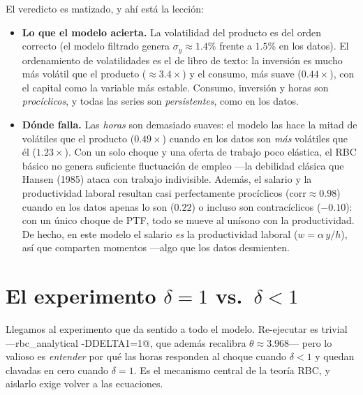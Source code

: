 \documentclass[11pt,a4paper]{report}
\begin{document}
El veredicto es matizado, y ahí está la lección:
\begin{itemize}[leftmargin=1.4em]
\item \textbf{Lo que el modelo acierta.} La volatilidad del producto es del orden
  correcto (el modelo filtrado genera $\sigma_y\approx1.4\%$ frente a $1.5\%$ en
  los datos). El ordenamiento de volatilidades es el de libro de texto: la
  inversión es mucho más volátil que el producto ($\approx3.4\times$) y el
  consumo, más suave ($0.44\times$), con el capital como la variable más estable.
  Consumo, inversión y horas son \emph{procíclicos}, y todas las series son
  \emph{persistentes}, como en los datos.
\item \textbf{Dónde falla.} Las \emph{horas} son demasiado suaves: el modelo las
  hace la mitad de volátiles que el producto ($0.49\times$) cuando en los datos
  son \emph{más} volátiles que él ($1.23\times$). Con un solo choque y una oferta
  de trabajo poco elástica, el RBC básico no genera suficiente fluctuación de
  empleo ---la debilidad clásica que Hansen (1985) ataca con trabajo indivisible.
  Además, el salario y la productividad laboral resultan casi perfectamente
  procíclicos ($\mathrm{corr}\approx0.98$) cuando en los datos apenas lo son
  ($0.22$) o incluso son contracíclicos ($-0.10$): con un único choque de PTF,
  todo se mueve al unísono con la productividad. De hecho, en este modelo el
  salario \emph{es} la productividad laboral ($w=\alpha\,y/h$), así que comparten
  momentos ---algo que los datos desmienten.
\end{itemize}

\section{El experimento $\delta=1$ vs.\ $\delta<1$}
\label{sec:experimento}

Llegamos al experimento que da sentido a todo el modelo. Re-ejecutar es trivial
---\lstinline@dynare rbc_analytical -DDELTA1=1@, que además recalibra
$\theta\approx3.968$--- pero lo valioso es \emph{entender} por qué las horas
responden al choque cuando $\delta<1$ y quedan clavadas en cero cuando $\delta=1$.
Es el mecanismo central de la teoría RBC, y aislarlo exige volver a las
ecuaciones.
\end{document}
